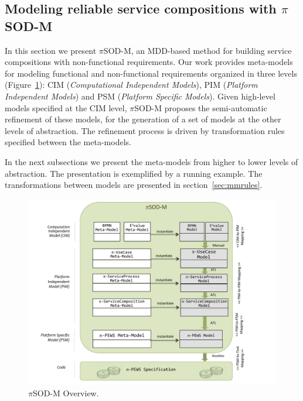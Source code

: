 \documentclass[12pt,twoside]{article}
\theoremstyle{plain}
\theoremstyle{plain}
\newcommand{\pisodm}[0]{$\pi$SOD-M\xspace}
\begin{document}
\begin{multicols}{2}
\section{Modeling reliable service compositions with \pisodm}\label{sec:motivation}

In this section we present \pisodm, an MDD-based method for building service compositions with non-functional requirements.
Our work provides meta-models for modeling functional and non-functional requirements organized in three levels (Figure~\ref{fig:piSOD-M}): CIM (\textit{Computational Independent Models}), PIM (\textit{Plat\-form Independent Models}) and PSM (\textit{Platform Specific Models}).
Given  high-level models specified at the CIM level, \pisodm proposes the semi-automatic refinement of these models, for the generation of a set of models at the other levels of abstraction.
The refinement process is driven by transformation rules specified between the meta-models.

In the next subsections we present the me\-ta-models from higher to lower levels of abstraction.
The presentation is exemplified by a running example.
The transformations between models are presented in section~\ref{sec:mmrules}.

\begin{figure}
\centering
\includegraphics[width=1.0\textwidth]{piSOD-M_process.pdf}
\caption{\pisodm Overview.}
\label{fig:piSOD-M}
\end{figure}




\end{multicols}
\end{document}
